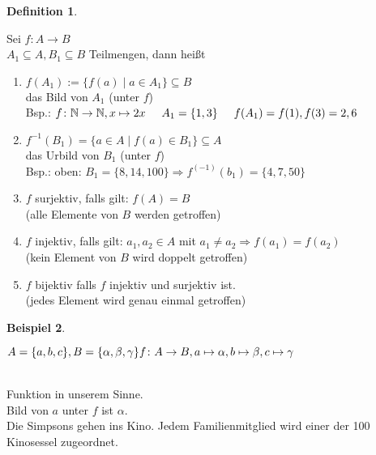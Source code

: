 \documentclass[a4paper,11pt]{article}
\newtheorem{definition}{Definition}[section]
\newtheorem{bsp}[definition]{Beispiel}
\begin{document}
\begin{definition}
\end{definition}
Sei $f\colon A\rightarrow B$ \\
$A_1 \subseteq A, B_1 \subseteq B$ Teilmengen, dann heißt
\begin{enumerate}[label=\alph*)]
\item $f(A_1) := \{f(a)\mid a\in A_1\} \subseteq B$ \\
das Bild von $A_1$ (unter $f$) \\
Bsp.: $f\colon\mathbb{N}\rightarrow\mathbb{N}, x\mapsto 2x \hspace{5mm} A_1=\{1,3\} \hspace{5mm} f(A_1)=f(1),f(3)=2,6$
\item $f^{-1}(B_1)=\{a\in A\mid f(a)\in B_1\} \subseteq A$ \\
das Urbild von $B_1$ (unter $f$) \\
Bsp.: oben: $B_1=\{8,14,100\} \Rightarrow f^(-1)(b_1)=\{4,7,50\}$
\item $f$ surjektiv, falls gilt: $f(A)=B$ \\
(alle Elemente von $B$ werden getroffen)
\item $f$ injektiv, falls gilt: $a_1, a_2 \in A$ mit $a_1 \neq a_2 \Rightarrow f(a_1) = f(a_2)$ \\
(kein Element von $B$ wird doppelt getroffen)
\item $f$ bijektiv falls $f$ injektiv und surjektiv ist. \\
(jedes Element wird genau einmal getroffen)
\end{enumerate}
\begin{bsp}
\end{bsp}
$A=\{a,b,c\}, B=\{\alpha,\beta,\gamma\} \\
f\colon A\rightarrow B, a\mapsto\alpha, b\mapsto\beta, c\mapsto\gamma$ \\
 \\
Funktion in unserem Sinne. \\
Bild von $a$ unter $f$ ist $\alpha$. \\
\newpage
Die Simpsons gehen ins Kino. Jedem Familienmitglied wird einer der 100 Kinosessel zugeordnet. \\
\end{document}
